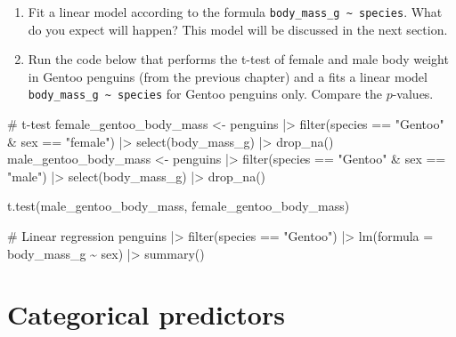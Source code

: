 \documentclass[
  letterpaper,
  DIV=11,
  numbers=noendperiod]{scrreprt}
\newenvironment{Shaded}{\begin{snugshade}}{\end{snugshade}}
\newcommand{\AttributeTok}[1]{\textcolor[rgb]{0.40,0.45,0.13}{#1}}
\newcommand{\CommentTok}[1]{\textcolor[rgb]{0.37,0.37,0.37}{#1}}
\newcommand{\FunctionTok}[1]{\textcolor[rgb]{0.28,0.35,0.67}{#1}}
\newcommand{\NormalTok}[1]{\textcolor[rgb]{0.00,0.23,0.31}{#1}}
\newcommand{\OtherTok}[1]{\textcolor[rgb]{0.00,0.23,0.31}{#1}}
\newcommand{\SpecialCharTok}[1]{\textcolor[rgb]{0.37,0.37,0.37}{#1}}
\newcommand{\StringTok}[1]{\textcolor[rgb]{0.13,0.47,0.30}{#1}}
\providecommand{\tightlist}{%
  \setlength{\itemsep}{0pt}\setlength{\parskip}{0pt}}\usepackage{longtable,booktabs,array}
\begin{document}
\begin{enumerate}
\def\labelenumi{\arabic{enumi}.}
\setcounter{enumi}{2}
\tightlist
\item
  Fit a linear model according to the formula
  \texttt{body\_mass\_g\ \textasciitilde{}\ species}. What do you expect
  will happen? This model will be discussed in the next section.
\item
  Run the code below that performs the t-test of female and male body
  weight in Gentoo penguins (from the previous chapter) and a fits a
  linear model \texttt{body\_mass\_g\ \textasciitilde{}\ species} for
  Gentoo penguins only. Compare the \(p\)-values.
\end{enumerate}

\begin{Shaded}
\begin{Highlighting}[]
\CommentTok{\# t{-}test}
\NormalTok{female\_gentoo\_body\_mass }\OtherTok{\textless{}{-}}\NormalTok{ penguins }\SpecialCharTok{|\textgreater{}}
  \FunctionTok{filter}\NormalTok{(species }\SpecialCharTok{==} \StringTok{"Gentoo"} \SpecialCharTok{\&}\NormalTok{ sex }\SpecialCharTok{==} \StringTok{"female"}\NormalTok{) }\SpecialCharTok{|\textgreater{}}
  \FunctionTok{select}\NormalTok{(body\_mass\_g) }\SpecialCharTok{|\textgreater{}}
  \FunctionTok{drop\_na}\NormalTok{()}
\NormalTok{male\_gentoo\_body\_mass }\OtherTok{\textless{}{-}}\NormalTok{ penguins }\SpecialCharTok{|\textgreater{}}
  \FunctionTok{filter}\NormalTok{(species }\SpecialCharTok{==} \StringTok{"Gentoo"} \SpecialCharTok{\&}\NormalTok{ sex }\SpecialCharTok{==} \StringTok{"male"}\NormalTok{) }\SpecialCharTok{|\textgreater{}}
  \FunctionTok{select}\NormalTok{(body\_mass\_g) }\SpecialCharTok{|\textgreater{}}
  \FunctionTok{drop\_na}\NormalTok{()}

\FunctionTok{t.test}\NormalTok{(male\_gentoo\_body\_mass, female\_gentoo\_body\_mass)}

\CommentTok{\# Linear regression}
\NormalTok{penguins }\SpecialCharTok{|\textgreater{}} 
  \FunctionTok{filter}\NormalTok{(species }\SpecialCharTok{==} \StringTok{"Gentoo"}\NormalTok{) }\SpecialCharTok{|\textgreater{}}
  \FunctionTok{lm}\NormalTok{(}\AttributeTok{formula =}\NormalTok{ body\_mass\_g }\SpecialCharTok{\textasciitilde{}}\NormalTok{ sex) }\SpecialCharTok{|\textgreater{}}
  \FunctionTok{summary}\NormalTok{()}
\end{Highlighting}
\end{Shaded}

\section{Categorical predictors}\label{categorical-predictors}
\end{document}
